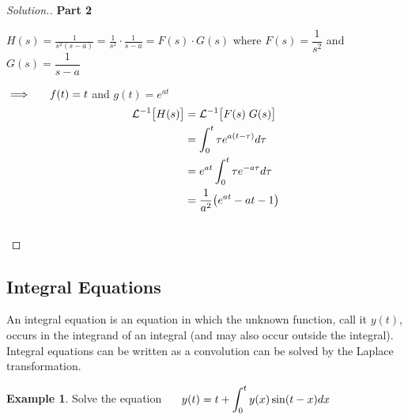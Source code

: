 \documentclass[11pt,a4paper]{article}
\theoremstyle{definition}
\newtheorem{exa}[thm]{Example}
\newenvironment{solution}
  {\renewcommand{\qedsymbol}{}\begin{proof}[\textit{Solution}.]}
  {\end{proof}}
\newcommand{\subhead}[1]{%
  \par\medskip\noindent\textbf{#1}\par\nobreak\smallskip}
\begin{document}
\begin{solution}
\subhead{Part 2}
$\displaystyle{H(s) = \frac{1}{s^2 (s-a)} = \frac{1}{s^2}\cdot \frac{1}{s-a}= F(s)\cdot G(s)}$ where $F(s)= \dfrac{1}{s^2}$ and $G(s) = \dfrac{1}{s -a}$

$\implies\hspace{0.5cm}f(t) = t$ and $g(t) = e^{at}$
\begin{align*}
\mathcal{L}^{-1}\big[H(s)\big] & = \mathcal{L}^{-1}\big[F(s)\hspace{0.1cm} G(s)\big]\\
& = \int^t_0 \tau e^{a(t-\tau)} d\tau \\
& = e^{at} \int^t_0\tau e^{-a\tau}d \tau\\
& = \frac{1}{a^2}\big(e^{at} -at -1\big)\\\\
\end{align*}
\end{solution}

{\color[wave]{485}\subsection{Integral Equations}}
An integral equation is an equation in which the unknown function, call it $y(t)$, occurs in the integrand of an integral (and may also occur outside the integral). Integral equations can be written as a convolution can be solved by the Laplace transformation.


\begin{exa}


Solve the equation $\hspace{0.5cm}\displaystyle{y(t) = t + \int^t_0 y(x)\sin (t -x)dx}$
\end{exa}
\end{document}
